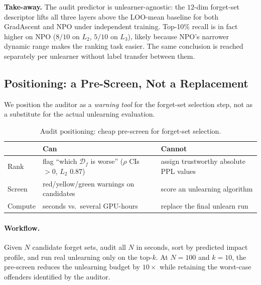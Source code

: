 \documentclass[11pt]{article}
\newcommand{\Df}{\mathcal{D}_f}
\newcommand{\Ltwo}{L_2}
\newcommand{\Lthree}{L_3}
\begin{document}
\textbf{Take-away.} The audit predictor is unlearner-agnostic: the $12$-dim
forget-set descriptor lifts all three layers above the LOO-mean baseline for
both GradAscent and NPO under independent training. Top-10\% recall is in fact
higher on NPO ($8/10$ on $\Ltwo$, $5/10$ on $\Lthree$), likely because NPO's
narrower dynamic range makes the ranking task easier. The same conclusion is
reached separately per unlearner without label transfer between them.

\subsection{Positioning: a Pre-Screen, Not a Replacement}
\label{sec:positioning}

We position the auditor as a \emph{warning tool} for the forget-set selection step, not as a substitute for the actual unlearning evaluation.

\begin{table}[t]
\centering
\small
\setlength{\tabcolsep}{3pt}
\renewcommand{\arraystretch}{1.05}
\begin{tabular}{@{}p{} p{} p{}@{}}
    \toprule
              & \textbf{Can}                                  & \textbf{Cannot} \\
    \midrule
    Rank      & flag ``which $\Df$ is worse'' ($\rho$ CIs $\!>\!0$, $\Ltwo$ $0.87$) & assign trustworthy absolute PPL values \\
    Screen    & red/yellow/green warnings on candidates       & score an unlearning algorithm \\
    Compute   & seconds vs.\ several GPU-hours                & replace the final unlearn run \\
    \bottomrule
\end{tabular}
\caption{Audit positioning: cheap pre-screen for forget-set selection.}
\label{tab:positioning}
\end{table}

\paragraph{Workflow.} Given $N$ candidate forget sets, audit all $N$ in seconds, sort by predicted impact profile, and run real unlearning only on the top-$k$. At $N{=}100$ and $k{=}10$, the pre-screen reduces the unlearning budget by $10\times$ while retaining the worst-case offenders identified by the auditor.

\end{document}
